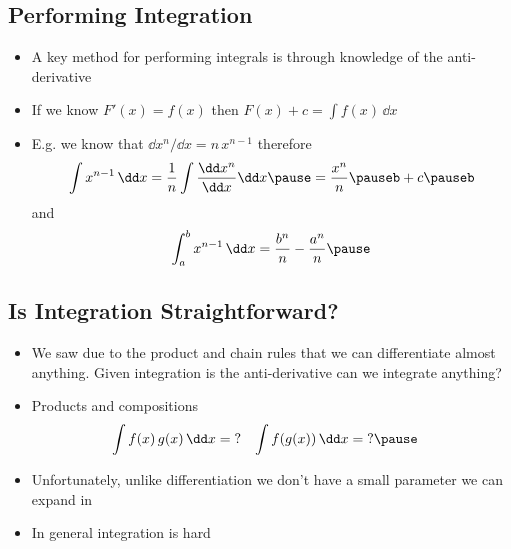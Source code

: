 \Outline %

\begin{slide}
\section{Performing Integration}

\begin{PauseHighLight}
  \begin{itemize}
  \item A key method for performing integrals is through knowledge of
    the anti-derivative\pause
  \item If we know $F'(x) = f(x)$ then $F(x) + c = \int f(x)\, \dd
    x$\pause
  \item E.g. we know that $\dd x^n/ \dd x = n\, x^{n-1}$ therefore
    \begin{align*}
      \int x^{n-1} \, \dd x = \frac{1}{n} \int \frac{\dd x^{n}}{\dd x}
      \dd x \pause= \frac{x^n}{n}\pauseb + c\pauseb
    \end{align*}
    and
    \begin{align*}
      \int_a^b x^{n-1} \, \dd x = \frac{b^n}{n} - \frac{a^n}{n} \pause
    \end{align*}
  \end{itemize}
\end{PauseHighLight}

\end{slide}


\begin{slide}
\section[-2]{Is Integration Straightforward?}

\begin{PauseHighLight}\squeeze
  \begin{itemize}
  \item We saw due to the product and chain rules that we can
    differentiate almost anything\pause.  Given integration is the
    anti-derivative can we integrate anything?\pauseb
  \item Products and compositions
    \begin{align*}
      \int f(x) \, g(x) \, \dd x &=\; ? &  \int f(g(x)) \, \dd x  &= \;?\pause
    \end{align*}
  \item Unfortunately, unlike differentiation we don't have a small
    parameter we can expand in\pause
  \item In general integration is hard\pause
  \end{itemize}
\end{PauseHighLight}

\end{slide}


